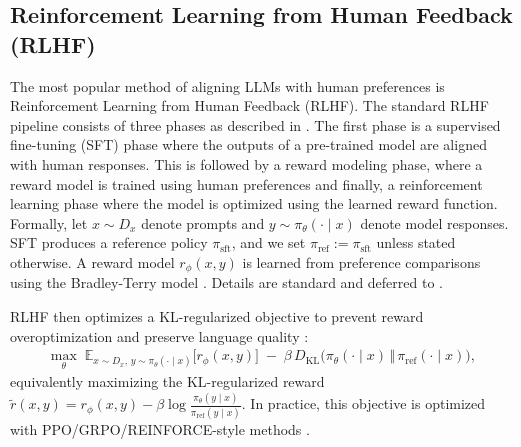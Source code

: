 
\subsection{Reinforcement Learning from Human Feedback (RLHF)}

The most popular method of aligning LLMs with human preferences is Reinforcement Learning from Human Feedback (RLHF). The standard RLHF pipeline consists of three phases as described in \cite{Christiano2017DeepRL,Ouyang2022TrainingLM}. The first phase is a supervised fine-tuning (SFT) phase where the outputs of a pre-trained model are aligned with human responses. This is followed by a reward modeling phase, where a reward model is trained using human preferences and finally, a reinforcement learning phase where the model is optimized using the learned reward function. Formally, let  $x \sim D_x$  denote prompts and  $y \sim \pi_\theta(\cdot \mid x)$  denote model responses. SFT produces a reference policy  $\pi_{\mathrm{sft}}$, and we set  $\pi_{\mathrm{ref}} := \pi_{\mathrm{sft}}$  unless stated otherwise. A reward model  $r_\phi(x,y)$  is learned from preference comparisons using the Bradley-Terry model \citep{bradley1952rank}. Details are standard and deferred to .

RLHF then optimizes a KL-regularized objective to prevent reward overoptimization and preserve language quality \citep{Ouyang2022TrainingLM,stiennon2022learningsummarizehumanfeedback,Gao2022ScalingLF,Rafailov2024ScalingLF}:
\begin{align}
  \max_\theta\;\mathbb{E}_{x \sim D_x,\, y \sim \pi_\theta(\cdot\mid x)}\!\big[r_\phi(x,y)\big]\;-\;\beta\,D_{\mathrm{KL}}\!\Big(\pi_\theta(\cdot\mid x)\,\Vert\,\pi_{\mathrm{ref}}(\cdot\mid x)\Big),
\end{align}
equivalently maximizing the KL-regularized reward  $\tilde r(x,y)=r_\phi(x,y)-\beta\log\frac{\pi_\theta(y\mid x)}{\pi_{\mathrm{ref}}(y\mid x)}$. In practice, this objective is optimized with PPO/GRPO/REINFORCE-style methods \citep{williams1992simple,ahmadian2024basicsrevisitingreinforcestyle,shao2024deepseekmathpushinglimitsmathematical,schulman2017proximalpolicyoptimizationalgorithms}.

